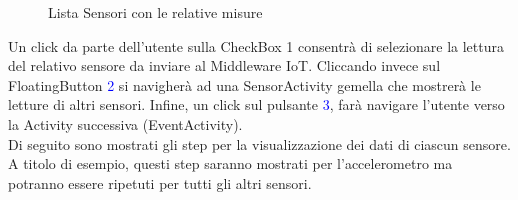 \begin{figure}%
	\centering
	\qquad
	\caption{Lista Sensori con le relative misure}%
	\label{fig:sensor_activity}%
\end{figure}
Un click da parte dell'utente sulla CheckBox \textcolor{mypink}{1} consentrà di selezionare la lettura del relativo sensore da inviare al Middleware IoT. Cliccando invece sul FloatingButton \textcolor{blue}{2} si navigherà ad una SensorActivity gemella che mostrerà le letture di altri sensori. Infine, un click sul pulsante \textcolor{blue}{3}, farà navigare l'utente verso la Activity successiva (EventActivity).\\
Di seguito sono mostrati gli step per la visualizzazione dei dati di ciascun sensore. A titolo di esempio, questi step saranno mostrati per l'accelerometro ma potranno essere ripetuti per tutti gli altri sensori.
